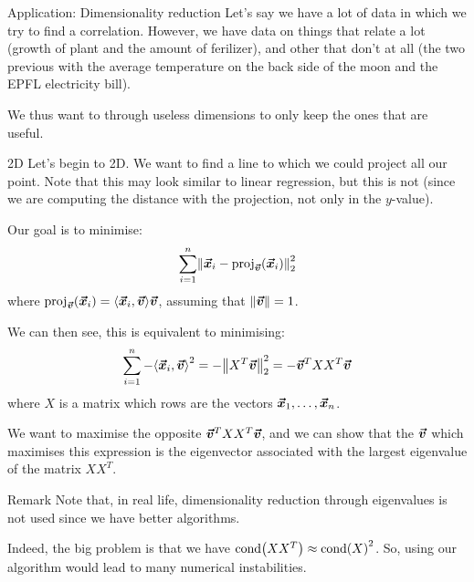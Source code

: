 \documentclass[a4paper]{article}
\begin{document}
\begin{parag}{Application: Dimensionality reduction}
    Let's say we have a lot of data in which we try to find a correlation. However, we have data on things that relate a lot (growth of plant and the amount of ferilizer), and other that don't at all (the two previous with the average temperature on the back side of the moon and the EPFL electricity bill).

    We thus want to through useless dimensions to only keep the ones that are useful. 

    \begin{subparag}{2D}
        Let's begin to 2D. We want to find a line to which we could project all our point. Note that this may look similar to linear regression, but this is not (since we are computing the distance with the projection, not only in the $y$-value).

        Our goal is to minimise: 
        \[\sum_{i=1}^{n} \left\|\bvec{x}_i - \proj_{\bvec{v}}\left(\bvec{x}_i\right)\right\|_2^2\]
        where $\proj_{\bvec{v}}\left(\bvec{x}_i\right) = \left\langle \bvec{x}_i, \bvec{v} \right\rangle \bvec{v}$, assuming that $\left\|\bvec{v}\right\| = 1$.

        We can then see, this is equivalent to minimising:
        \[\sum_{i=1}^{n} -\left\langle \bvec{x}_i, \bvec{v} \right\rangle^2 = - \left\|X^T \bvec{v}\right\|_2^2 = -\bvec{v}^T X X^T \bvec{v}\]
        where $X$ is a matrix which rows are the vectors $\bm{\protect\vec{x}}_1, \ldots, \bm{\protect\vec{x}}_n$.

        We want to maximise the opposite $\bm{\protect\vec{v}}^T X X^T \bm{\protect\vec{v}}$, and we can show that the $\bm{\protect\vec{v}}$ which maximises this expression is the eigenvector associated with the largest eigenvalue of the matrix $X X^T$.
    \end{subparag}

    \begin{subparag}{Remark}
        Note that, in real life, dimensionality reduction through eigenvalues is not used since we have better algorithms.

        Indeed, the big problem is that we have $\cond\left(X X^T\right) \approx \cond\left(X\right)^2$. So, using our algorithm would lead to many numerical instabilities.
    \end{subparag}
\end{parag}
\end{document}
